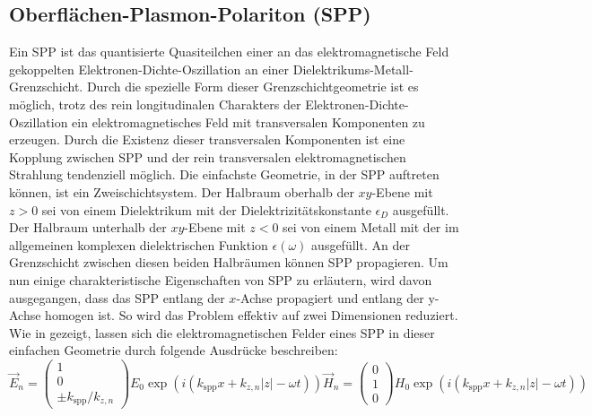 \documentclass[titlepage]{article}
\begin{document}
	\subsection{Oberflächen-Plasmon-Polariton (SPP)}		
	Ein SPP ist das quantisierte Quasiteilchen einer an das elektromagnetische Feld gekoppelten Elektronen-Dichte-Oszillation an einer Dielektrikums-Metall-Grenzschicht. Durch die spezielle Form dieser Grenzschichtgeometrie ist es möglich, trotz des rein longitudinalen Charakters der Elektronen-Dichte-Oszillation ein elektromagnetisches Feld mit transversalen Komponenten zu erzeugen. Durch die Existenz dieser transversalen Komponenten ist eine Kopplung zwischen SPP und der rein transversalen elektromagnetischen Strahlung tendenziell möglich. Die einfachste Geometrie, in der SPP auftreten können, ist ein Zweischichtsystem. Der Halbraum oberhalb der $xy$-Ebene mit $z>0$ sei von einem Dielektrikum mit der Dielektrizitätskonstante $\epsilon_D$ ausgefüllt. Der Halbraum unterhalb der $xy$-Ebene mit $z<0$ sei von einem Metall mit der im allgemeinen komplexen dielektrischen Funktion $\epsilon(\omega)$ ausgefüllt. An der Grenzschicht zwischen diesen beiden Halbräumen können SPP propagieren. Um nun einige charakteristische Eigenschaften von SPP zu erläutern, wird davon ausgegangen, dass das SPP entlang der $x$-Achse propagiert und entlang der y-Achse homogen ist. So wird das Problem effektiv auf zwei Dimensionen reduziert. Wie in \cite{Maier.2007} gezeigt, lassen sich die elektromagnetischen Felder eines SPP in dieser einfachen Geometrie durch folgende Ausdrücke beschreiben:
	\begin{subequations}
		\label{eq:fields_spp}
		\begin{equation}
			\label{eq:electric_field_spp}
			\vec{E}_n = \begin{pmatrix} 1 \\ 0 \\ \pm k_{\mathrm{spp}}/k_{z,n} \end{pmatrix} E_0 \exp\left(i(k_{\mathrm{spp}}x + k_{z, n}|z|-\omega t)\right)	
		\end{equation}
		\begin{equation}
			\label{eq:magnetic_field_spp}
			\vec{H}_n = \begin{pmatrix} 0 \\ 1 \\ 0 \end{pmatrix} H_0 \exp\left(i(k_{\mathrm{spp}}x + k_{z, n}|z|-\omega t)\right)
		\end{equation}
	\end{subequations}
	
\end{document}
